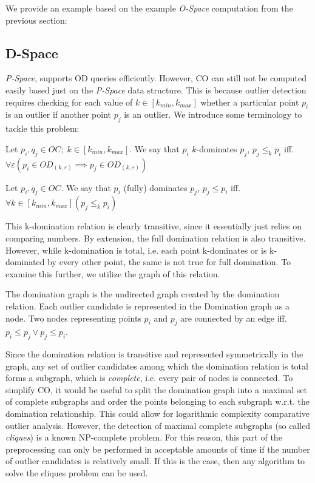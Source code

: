 \documentclass[runningheads]{llncs}
\begin{document}
We provide an example based on the example \emph{O-Space} computation from the previous section:
\subsection{D-Space}
\emph{P-Space}, supports OD queries efficiently. However, CO can still not be computed easily based just on the \emph{P-Space} data structure. This is because outlier detection requires checking for each value of $k \in [k_{min},k_{max}]$ whether a particular point $p_i$ is an outlier if another point $p_j$ is an outlier. We introduce some terminology to tackle this problem:
\begin{definition}[k-domination]
Let $p_i,q_j \in OC;\; k\in [k_{min},k_{max}]$. We say that $p_i$ $k$-dominates $p_j$, $p_j \leq_{k} p_i$ iff. $\forall\varepsilon(p_i \in OD_{(k,\varepsilon)} \implies p_j \in OD_{(k,\varepsilon)})$
\end{definition}
\begin{definition}
Let $p_i,q_j \in OC$. We say that $p_i$ (fully) dominates $p_j$, $p_j \leq p_i$ iff. $\forall k\in [k_{min},k_{max}](p_j \leq_k p_i)$
\end{definition}
This k-domination relation is clearly transitive, since it essentially just relies on comparing numbers. By extension, the full domination relation is also transitive. However, while k-domination is total, i.e. each point k-dominates or is k-dominated by every other point, the same is not true for full domination. To examine this further, we utilize the graph of this relation.
\begin{definition}
The domination graph is the undirected graph created by the domination relation. Each outlier candidate is represented in the Domination graph as a node. Two nodes representing points $p_i$ and $p_j$ are connected by an edge iff. $p_i \leq p_j \vee p_j \leq p_i$.
\end{definition}

Since the domination relation is transitive and represented symmetrically in the graph, any set of outlier candidates among which the domination relation is total forms a subgraph, which is \emph{complete}, i.e. every pair of nodes is connected. To simplify CO, it would be useful to split the domination graph into a maximal set of complete subgraphs and order the points belonging to each subgraph w.r.t. the domination relationship. This could allow for logarithmic complexity comparative outlier analysis. However, the detection of maximal complete subgraphs (so called \emph{cliques}) is a known NP-complete problem. For this reason, this part of the preprocessing can only be performed in acceptable amounts of time if the number of outlier candidates is relatively small. If this is the case, then any algorithm to solve the cliques problem can be used.
\end{document}
